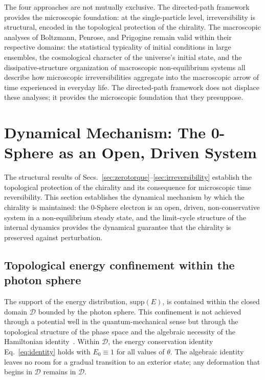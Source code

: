 \documentclass[%
 reprint, amsmath,amssymb, aps, prb, ]{revtex4-2}
\numberwithin{equation}{section}
\begin{document}
The four approaches are not mutually exclusive. The directed-path framework provides the microscopic foundation: at the single-particle level, irreversibility is structural, encoded in the topological protection of the chirality. The macroscopic analyses of Boltzmann, Penrose, and Prigogine remain valid within their respective domains: the statistical typicality of initial conditions in large ensembles, the cosmological character of the universe's initial state, and the dissipative-structure organization of macroscopic non-equilibrium systems all describe how microscopic irreversibilities aggregate into the macroscopic arrow of time experienced in everyday life. The directed-path framework does not displace these analyses; it provides the microscopic foundation that they presuppose.


\section{Dynamical Mechanism: The 0-Sphere as an Open, Driven System}
\label{sec:opendriven}

The structural results of Secs.~\ref{sec:zerotorque}--\ref{sec:irreversibility} establish the topological protection of the chirality and its consequence for microscopic time reversibility. This section establishes the dynamical mechanism by which the chirality is maintained: the 0-Sphere electron is an open, driven, non-conservative system in a non-equilibrium steady state, and the limit-cycle structure of the internal dynamics provides the dynamical guarantee that the chirality is preserved against perturbation.

\subsection{Topological energy confinement within the photon sphere}
\label{sec:confinement}

The support of the energy distribution, $\mathrm{supp}(E)$, is contained within the closed domain $\mathcal{D}$ bounded by the photon sphere. This confinement is not achieved through a potential well in the quantum-mechanical sense but through the topological structure of the phase space and the algebraic necessity of the Hamiltonian identity~\cite{hanamura33}. Within $\mathcal{D}$, the energy conservation identity Eq.~\eqref{eq:identity} holds with $E_0 \equiv 1$ for all values of $\theta$. The algebraic identity leaves no room for a gradual transition to an exterior state; any deformation that begins in $\mathcal{D}$ remains in $\mathcal{D}$.
\end{document}
